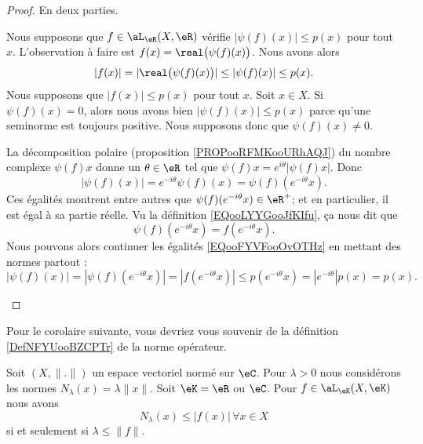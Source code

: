 \begin{proof}
    En deux parties.
    \begin{subproof}
        \spitem[\( \Rightarrow\)]
        Nous supposons que \( f\in \aL_{\eR}(X,\eR)\) vérifie \( | \psi(f)(x) |\leq p(x)\) pour tout \( x\). L'observation à faire est \( f(x)=\real\big( \psi(f)(x) \big)\). Nous avons alors
        \begin{equation}
            | f(x) |=| \real\big( \psi(f)(x) \big) |\leq | \psi(f)(x) |\leq p(x).
        \end{equation}
        \spitem[\( \Leftarrow\)]
        Nous supposons que \( | f(x) |\leq p(x)\) pour tout \( x\). Soit \( x\in X\). Si \( \psi(f)(x)=0\), alors nous avons bien \( | \psi(f)(x) |\leq p(x)\) parce qu'une seminorme est toujours positive. Nous supposons donc que \( \psi(f)(x)\neq 0\).

        La décomposition polaire (proposition \ref{PROPooRFMKooURhAQJ}) du nombre complexe \( \psi(f)x\) donne un \( \theta\in \eR\) tel que \( \psi(f)x= e^{i\theta}| \psi(f)x |\). Donc
        \begin{equation}        \label{EQooFYVFooOvOTHz}
            | \psi(f)(x) |= e^{-i\theta}\psi(f)(x)=\psi(f)( e^{-i\theta}x).
        \end{equation}
        Ces égalités montrent entre autres que \( \psi(f)( e^{-i\theta}x)\in \eR^+\); et en particulier, il est égal à sa partie réelle. Vu la définition \eqref{EQooLYYGooJfKIfu}, ça nous dit que
        \begin{equation}
            \psi(f)( e^{-i\theta}x)=f( e^{-i\theta}x).
        \end{equation}
        Nous pouvons alors continuer les égalités \eqref{EQooFYVFooOvOTHz} en mettant des normes partout :
        \begin{equation}
            | \psi(f)(x) |=| \psi(f)( e^{-i\theta}x) |=| f( e^{-i\theta}x) |\leq p( e^{-i\theta}x)=|  e^{-i\theta} |p(x)=p(x).
        \end{equation}
    \end{subproof}
\end{proof}

Pour le corolaire suivante, vous devriez vous souvenir de la définition \ref{DefNFYUooBZCPTr} de la norme opérateur.

\begin{corollary}        \label{CORooZEKAooENCDNJ}
    Soit \( (X,\| . \|)\) un espace vectoriel normé sur \( \eC\). Pour \( \lambda>0\) nous considérons les normes \( N_{\lambda}(x)=\lambda\| x \|\). Soit \( \eK=\eR\) ou \( \eC\). Pour \( f\in\aL_{\eK}(X,\eK)\) nous avons
    \begin{equation}
        N_{\lambda}(x)\leq | f(x) |\,\forall x\in X
    \end{equation}
    si et seulement si \( \lambda\leq \| f \|\).
\end{corollary}

